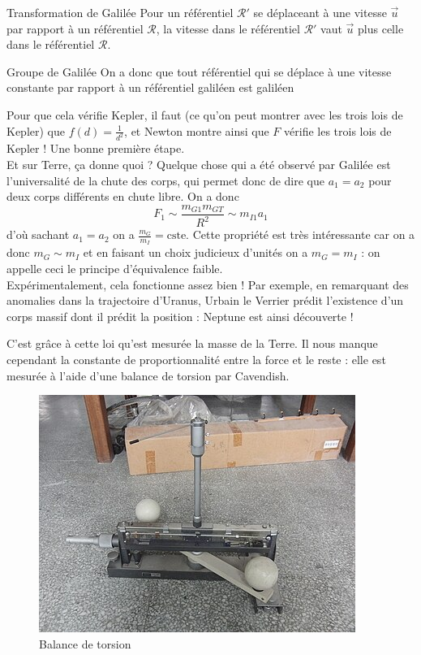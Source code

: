 \documentclass{classe}
\begin{document}
\begin{théorème}{Transformation de Galilée}{}
Pour un référentiel $\mathcal{R}'$ se déplaceant à une vitesse $\vec{u}$ par rapport à un référentiel $\mathcal{R}$, la vitesse dans le référentiel $\mathcal{R}'$ vaut $\vec{u}$ plus celle dans le référentiel $\mathcal{R}$.
\end{théorème}

\begin{remarque}{Groupe de Galilée}{}
On a donc que tout référentiel qui se déplace à une vitesse constante par rapport à un référentiel galiléen est galiléen
\end{remarque}

Pour que cela vérifie Kepler, il faut (ce qu'on peut montrer avec les trois lois de Kepler) que $f(d) = \frac{1}{d^2}$, et Newton montre ainsi que $F$ vérifie les trois lois de Kepler ! Une bonne première étape.\\

Et sur Terre, ça donne quoi ? Quelque chose qui a été observé par Galilée est l'universalité de la chute des corps, qui permet donc de dire que $a_1 = a_2$ pour deux corps différents en chute libre. On a donc 
$$F_1\sim \frac{m_{G1} m_{GT}}{R^2} \sim m_{I1}a_1$$
d'où sachant $a_1 = a_2$ on a $\frac{m_G}{m_I} = \textrm{cste}$.
Cette propriété est très intéressante car on a donc $m_G\sim m_I$ et en faisant un choix judicieux d'unités on a $m_G = m_I$ : on appelle ceci le principe d'équivalence faible.\\

Expérimentalement, cela fonctionne assez bien ! Par exemple, en remarquant des anomalies dans la trajectoire d'Uranus, Urbain le Verrier prédit l'existence d'un corps massif dont il prédit la position : Neptune est ainsi découverte !

C'est grâce à cette loi qu'est mesurée la masse de la Terre. Il nous manque cependant la constante de proportionnalité entre la force et le reste : elle est mesurée à l'aide d'une balance de torsion par Cavendish.

\begin{figure}[H]
\centering
\includegraphics[scale=.7]{Cavendish.jpg}
\caption{Balance de torsion}
\end{figure}
\end{document}
